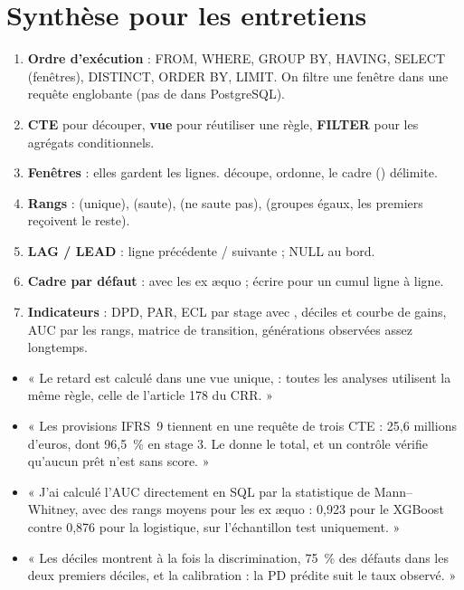 \section{Synthèse pour les entretiens}

\begin{resume}
\begin{enumerate}
\item \textbf{Ordre d'exécution} : FROM, WHERE, GROUP BY, HAVING, SELECT (fenêtres), DISTINCT, ORDER BY,
LIMIT. On filtre une fenêtre dans une requête englobante (pas de  dans PostgreSQL).
\item \textbf{CTE} pour découper, \textbf{vue} pour réutiliser une règle, \textbf{FILTER} pour les
agrégats conditionnels.
\item \textbf{Fenêtres} : elles gardent les lignes.  découpe,  ordonne,
le cadre () délimite.
\item \textbf{Rangs} :  (unique),  (saute),  (ne saute
pas),  (groupes égaux, les premiers reçoivent le reste).
\item \textbf{LAG / LEAD} : ligne précédente / suivante ; NULL au bord.
\item \textbf{Cadre par défaut} :  avec les ex æquo ; écrire  pour un cumul ligne à
ligne.
\item \textbf{Indicateurs} : DPD, PAR, ECL par stage avec , déciles et courbe de gains, AUC
par les rangs, matrice de transition, générations observées assez longtemps.
\end{enumerate}
\end{resume}

\begin{entretien}
\begin{itemize}
\item « Le retard est calculé dans une vue unique,  : toutes les analyses
utilisent la même règle, celle de l'article 178 du CRR. »
\item « Les provisions IFRS~9 tiennent en une requête de trois CTE : 25,6 millions d'euros, dont 96,5~\%
en stage 3. Le  donne le total, et un contrôle vérifie qu'aucun prêt n'est sans score. »
\item « J'ai calculé l'AUC directement en SQL par la statistique de Mann--Whitney, avec des rangs
moyens pour les ex æquo : 0,923 pour le XGBoost contre 0,876 pour la logistique, sur l'échantillon
test uniquement. »
\item « Les déciles montrent à la fois la discrimination, 75~\% des défauts dans les deux premiers
déciles, et la calibration : la PD prédite suit le taux observé. »
\end{itemize}
\end{entretien}

